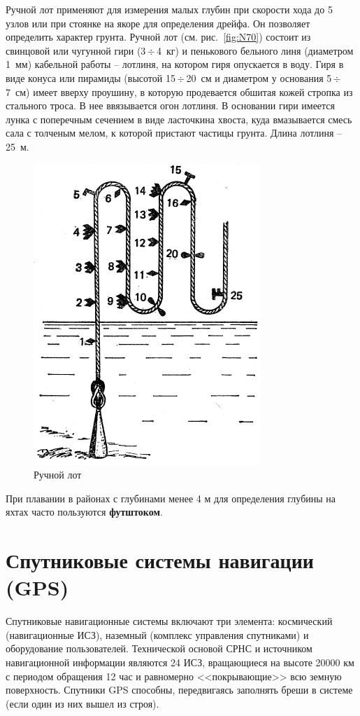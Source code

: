 \documentclass[a4paper, 12pt, twoside, final, book, russian, fittopage, cyremdash]{ncc}
\newcommand{\otdo}{\,\ensuremath{\div}\,}
\newcommand{\ris}[1]{\ref{fig:#1}}
\begin{document}
Ручной лот применяют для измерения малых глубин при скорости хода до 5 узлов или при стоянке на якоре для определения дрейфа. Он позволяет определить характер грунта. Ручной лот (см. рис.~\ris{N70}) состоит из свинцовой или чугунной гири (3\otdo 4~кг) и пенькового бельного линя (диаметром 1~мм) кабельной работы \--- лотлиня, на котором гиря опускается в воду. Гиря в виде конуса или пирамиды (высотой 15\otdo 20~см и диаметром у основания 5\otdo 7~см) имеет вверху проушину, в которую продевается обшитая кожей стропка из стального троса. В нее ввязывается огон лотлиня. В основании гири имеется лунка с поперечным сечением в виде ласточкина хвоста, куда вмазывается смесь сала с толченым мелом, к которой пристают частицы грунта. Длина лотлиня \--- 25~м. 

\begin{figure}[htb]
  \centering{}
  \includegraphics[scale=1.2]{0070P}
  \caption{Ручной лот}
  \label{fig:N070}
\end{figure} 

При плавании в районах с глубинами менее 4 м для определения глубины на яхтах часто пользуются \textbf{футштоком}. 

\section{Спутниковые системы навигации (GPS)}

Спутниковые навигационные системы включают три элемента: космический (навигационные ИСЗ), наземный (комплекс управления спутниками) и оборудование пользователей. Технической основой СРНС и источником навигационной информации являются 24 ИСЗ, вращающиеся на высоте 20000 км с периодом обращения 12 час и равномерно <<покрывающие>> всю земную поверхность. Спутники GPS способны, передвигаясь заполнять бреши в системе (если один из них вышел из строя). 
\end{document}
